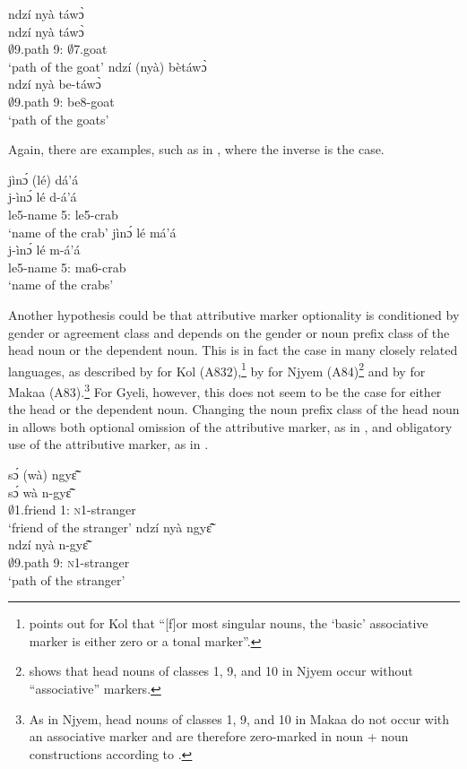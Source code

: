 \ea\label{pl}
\ea \label{pl1}
  \glll    ndzí nyà táwɔ̀\\
  ndzí nyà táwɔ̀ \\
               $\emptyset$9.path 9:{\ATT} $\emptyset$7.goat \\
    \trans `path of the goat'
\ex\label{pl2}
 \glll     ndzí (nyà) bètáwɔ̀ \\
   ndzí nyà be-táwɔ̀ \\
               $\emptyset$9.path 9:{\ATT} be8-goat \\
    \trans `path of the goats'
\z
\z

\noindent Again, there are examples, such as in , where the inverse is the case.

\ea\label{crab}
\ea \label{crab1}
  \glll     jìnɔ́ (lé) dá'á \\
  j-ìnɔ́ lé d-á'á \\
               le5-name 5:{\ATT} le5-crab \\
    \trans `name of the crab'
\ex\label{crab2}
 \glll     jìnɔ́ lé má'á \\
 j-ìnɔ́ lé m-á'á \\
              le5-name 5:{\ATT} ma6-crab \\
    \trans `name of the crabs'
\z
\z

Another hypothesis could be that attributive marker optionality is conditioned by gender or agreement class and depends on the gender or noun prefix class of the head noun  or the dependent noun. This is in fact the case in many closely related languages, as described by \citet{henson2007} for Kol (A832),\footnote{\citet[113]{henson2007}  points out for Kol that ``[f]or most singular nouns, the `basic' associative marker is either zero or a tonal marker''.} by \citet{beavon2006} for Njyem (A84)\footnote{\citet[118]{beavon2006} shows that head nouns of classes 1, 9, and 10 in Njyem occur without ``associative'' markers.} and by \citet{heath2003} for Makaa (A83).\footnote{As in Njyem, head nouns of classes 1, 9, and 10 in Makaa do not occur with an associative marker and are therefore zero-marked  in noun + noun constructions according to \citet[341]{heath2003}.} For Gyeli, however, this does not seem to be the case for either the head or the dependent noun. Changing the noun prefix class of the head noun in  allows both optional omission of the attributive marker, as in , and obligatory use of the attributive marker, as in .

\ea\label{R1}
\ea \label{R11}
  \glll   sɔ́ (wà) ngyɛ̃̂ \\
  sɔ́ wà n-gyɛ̃̂ \\
               $\emptyset$1.friend 1:{\ATT} \textsc{n}1-stranger \\
    \trans `friend of the stranger'
\ex\label{R12}
 \glll  ndzí nyà ngyɛ̃̂ \\
 ndzí nyà n-gyɛ̃̂ \\
               $\emptyset$9.path 9:{\ATT} \textsc{n}1-stranger \\
    \trans `path of the stranger'
\z
\z


